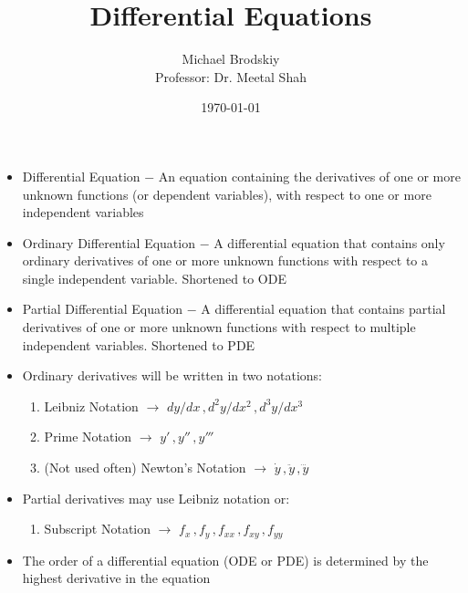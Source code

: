 \documentclass[12pt]{article}
\title{Differential Equations}
\date{\today}
\author{Michael Brodskiy\\ \small Professor: Dr. Meetal Shah}
\begin{document}
\maketitle

\begin{itemize}

  \item Differential Equation $-$ An equation containing the derivatives of one or more unknown functions (or dependent variables), with respect to one or more independent variables

  \item Ordinary Differential Equation $-$ A differential equation that contains only ordinary derivatives of one or more unknown functions with respect to a single independent variable. Shortened to ODE

  \item Partial Differential Equation $-$ A differential equation that contains partial derivatives of one or more unknown functions with respect to multiple independent variables. Shortened to PDE

  \item Ordinary derivatives will be written in two notations:

    \begin{enumerate}

      \item Leibniz Notation $\rightarrow$ $dy/dx\,,d^2y/dx^2\,,d^3y/dx^3$

      \item Prime Notation $\rightarrow$ $y'\,,y''\,,y'''$

      \item (Not used often) Newton's Notation $\rightarrow$ $\dot y\,,\ddot y\,, \dddot y$

    \end{enumerate}

  \item Partial derivatives may use Leibniz notation or:

    \begin{enumerate}

      \item Subscript Notation $\rightarrow$ $f_x\,,f_y\,,f_{xx}\,,f_{xy}\,,f_{yy}$

    \end{enumerate}

  \item The order of a differential equation (ODE or PDE) is determined by the highest derivative in the equation


\end{itemize}
\end{document}
